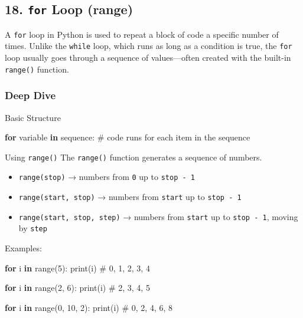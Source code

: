 \documentclass[
  letterpaper,
  DIV=11,
  numbers=noendperiod]{scrreprt}
\newenvironment{Shaded}{\begin{snugshade}}{\end{snugshade}}
\newcommand{\BuiltInTok}[1]{\textcolor[rgb]{0.00,0.23,0.31}{#1}}
\newcommand{\CommentTok}[1]{\textcolor[rgb]{0.37,0.37,0.37}{#1}}
\newcommand{\ControlFlowTok}[1]{\textcolor[rgb]{0.00,0.23,0.31}{\textbf{#1}}}
\newcommand{\DecValTok}[1]{\textcolor[rgb]{0.68,0.00,0.00}{#1}}
\newcommand{\KeywordTok}[1]{\textcolor[rgb]{0.00,0.23,0.31}{\textbf{#1}}}
\newcommand{\NormalTok}[1]{\textcolor[rgb]{0.00,0.23,0.31}{#1}}
\providecommand{\tightlist}{%
  \setlength{\itemsep}{0pt}\setlength{\parskip}{0pt}}
\begin{document}
\subsection{\texorpdfstring{18. \texttt{for} Loop
(range)}{18. for Loop (range)}}\label{for-loop-range}

A \texttt{for} loop in Python is used to repeat a block of code a
specific number of times. Unlike the \texttt{while} loop, which runs as
long as a condition is true, the \texttt{for} loop usually goes through
a sequence of values---often created with the built-in \texttt{range()}
function.

\subsubsection{Deep Dive}\label{deep-dive-18}

Basic Structure

\begin{Shaded}
\begin{Highlighting}[]
\ControlFlowTok{for}\NormalTok{ variable }\KeywordTok{in}\NormalTok{ sequence:}
    \CommentTok{\# code runs for each item in the sequence}
\end{Highlighting}
\end{Shaded}

Using \texttt{range()} The \texttt{range()} function generates a
sequence of numbers.

\begin{itemize}
\tightlist
\item
  \texttt{range(stop)} → numbers from \texttt{0} up to
  \texttt{stop\ -\ 1}
\item
  \texttt{range(start,\ stop)} → numbers from \texttt{start} up to
  \texttt{stop\ -\ 1}
\item
  \texttt{range(start,\ stop,\ step)} → numbers from \texttt{start} up
  to \texttt{stop\ -\ 1}, moving by \texttt{step}
\end{itemize}

Examples:

\begin{Shaded}
\begin{Highlighting}[]
\ControlFlowTok{for}\NormalTok{ i }\KeywordTok{in} \BuiltInTok{range}\NormalTok{(}\DecValTok{5}\NormalTok{):}
    \BuiltInTok{print}\NormalTok{(i)       }\CommentTok{\# 0, 1, 2, 3, 4}

\ControlFlowTok{for}\NormalTok{ i }\KeywordTok{in} \BuiltInTok{range}\NormalTok{(}\DecValTok{2}\NormalTok{, }\DecValTok{6}\NormalTok{):}
    \BuiltInTok{print}\NormalTok{(i)       }\CommentTok{\# 2, 3, 4, 5}

\ControlFlowTok{for}\NormalTok{ i }\KeywordTok{in} \BuiltInTok{range}\NormalTok{(}\DecValTok{0}\NormalTok{, }\DecValTok{10}\NormalTok{, }\DecValTok{2}\NormalTok{):}
    \BuiltInTok{print}\NormalTok{(i)       }\CommentTok{\# 0, 2, 4, 6, 8}
\end{Highlighting}
\end{Shaded}
\end{document}
